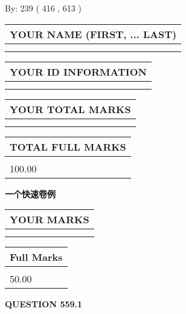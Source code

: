 \documentclass{ctexart}
\begin{document}
   
\hspace{1.0in} By: 
 239 ( 416 ,  613 )
   
   
   
   
\newpage 
\setcounter{page}{ 
   559001 } 
   
   
   
   
\noindent\begin{tabular}{|l|}
\hline
YOUR NAME (FIRST, ... LAST)  \\
\hline
 \\ 
 \\ 
\hline
\end{tabular}
\hspace{0.05in} \begin{tabular}{|l|}
\hline
 YOUR   ID   INFORMATION  \\
\hline
 \\ 
 \\ 
\hline
\end{tabular}
   
   
\vspace{0.2in}\noindent\begin{tabular}{|l|}
\hline
YOUR TOTAL MARKS  \\
\hline
 \\ 
 \\ 
\hline
\end{tabular}
\hspace{0.05in} \begin{tabular}{|l|}
\hline
TOTAL FULL MARKS  \\
\hline
 \\ 
100.00 \\
\hline
\end{tabular}
   
   
 \vspace{0.2in}
{\LARGE {\textbf{ 一个快速卷例}}}
   
   
  
\vspace{0.2in}
  
\noindent\begin{tabular}{|l|}
\hline
 YOUR MARKS  \\
\hline
 \\ 
 \\ 
\hline
\end{tabular}
\hspace{0.05in} \begin{tabular}{|l|}
\hline
 Full Marks  \\
\hline
 \\ 
50.00 \\
\hline
\end{tabular}
{\textbf{\Large{QUESTION
559.1 
}}}
  
\end{document}
